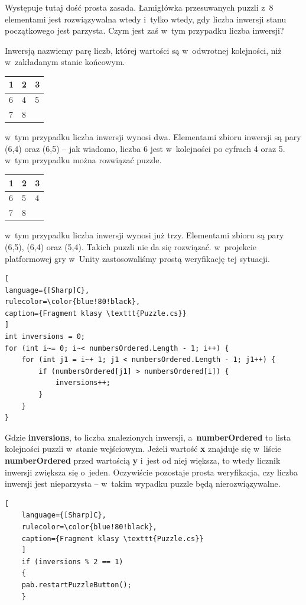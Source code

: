 \documentclass[oneside,polski,logo]{amuthesis}
\begin{document}
Występuje tutaj dość prosta zasada. Łamigłówka przesuwanych puzzli z~8 elementami jest rozwiązywalna wtedy i~tylko wtedy, gdy liczba inwersji stanu początkowego jest parzysta. Czym jest zaś w~tym przypadku liczba inwersji?

Inwersją nazwiemy parę liczb, której wartości są w~odwrotnej kolejności, niż w~zakładanym stanie końcowym. \cite{solvablePuzzle}

\begin{center}
\begin{tabular}{ | m{5em} | m{1cm}| m{1cm} | } 
\hline
 1 & 2 & 3 \\ 
\hline
 6 & 4 & 5 \\
\hline  
 7 & 8 &     \\
\hline
\end{tabular}
\end{center}

w~tym przypadku liczba inwersji wynosi dwa. Elementami zbioru inwersji są pary (6,4) oraz (6,5) – jak wiadomo, liczba 6 jest w~kolejności po cyfrach 4 oraz 5. w~tym przypadku można rozwiązać puzzle.

\begin{center}
\begin{tabular}{ | m{5em} | m{1cm}| m{1cm} | } 
\hline
 1 & 2 & 3 \\ 
\hline
 6 & 5 & 4 \\  
\hline
 7 & 8 &     \\
\hline
\end{tabular}
\end{center}

w~tym przypadku liczba inwersji wynosi już trzy. Elementami zbioru są pary (6,5), (6,4) oraz (5,4). Takich puzzli nie da się rozwiązać. 
w~projekcie platformowej gry w~Unity zastosowaliśmy prostą weryfikację tej sytuacji. 
\\
\begin{lstlisting}[
language={[Sharp]C},
rulecolor=\color{blue!80!black},
caption={Fragment klasy \texttt{Puzzle.cs}}
]
int inversions = 0;
for (int i~= 0; i~< numbersOrdered.Length - 1; i++) {
    for (int j1 = i~+ 1; j1 < numbersOrdered.Length - 1; j1++) {
        if (numbersOrdered[j1] > numbersOrdered[i]) {
            inversions++;
        }
    }
}

\end{lstlisting}
\par Gdzie \textbf{inversions}, to liczba znalezionych inwersji, a~\textbf{numberOrdered} to lista kolejności puzzli w~stanie wejściowym. Jeżeli wartość \textbf{x} znajduje się w~liście \textbf{numberOrdered} przed wartością \textbf{y} i~jest od niej większa, to wtedy licznik inwersji zwiększa się o~jeden.
Oczywiście pozostaje prosta weryfikacja, czy liczba inwersji jest nieparzysta – w~takim wypadku puzzle będą nierozwiązywalne.
\begin{lstlisting}[
	language={[Sharp]C},
	rulecolor=\color{blue!80!black},
	caption={Fragment klasy \texttt{Puzzle.cs}}
	]
	if (inversions % 2 == 1)
	{
	pab.restartPuzzleButton();
	}
\end{lstlisting}
\end{document}

